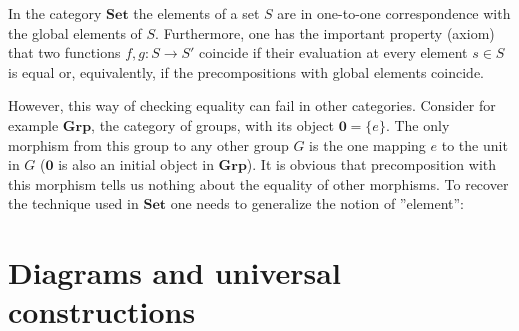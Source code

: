     \begin{remark}
        In the category $\mathbf{Set}$ the elements of a set $S$ are in one-to-one correspondence with the global elements of $S$. Furthermore, one has the important property (axiom) that two functions $f, g:S\rightarrow S'$ coincide if their evaluation at every element $s\in S$ is equal or, equivalently, if the precompositions with global elements coincide.

        However, this way of checking equality can fail in other categories. Consider for example $\mathbf{Grp}$, the category of groups, with its object $\mathbf{0} = \{e\}$. The only morphism from this group to any other group $G$ is the one mapping $e$ to the unit in $G$ ($\mathbf{0}$ is also an initial object in $\mathbf{Grp}$). It is obvious that precomposition with this morphism tells us nothing about the equality of other morphisms. To recover the technique used in $\mathbf{Set}$ one needs to generalize the notion of ''element'':
    \end{remark}

\section{Diagrams and universal constructions}\label{cat:section:diagrams}


